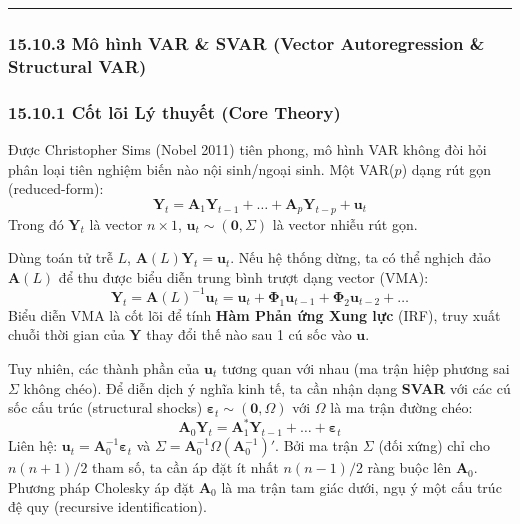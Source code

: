 \documentclass[
]{article}
\begin{document}
\begin{center}\rule{0.5\linewidth}{0.5pt}\end{center}

\subsubsection{15.10.3 Mô hình VAR \& SVAR (Vector Autoregression \&
Structural
VAR)}\label{muxf4-huxecnh-var-svar-vector-autoregression-structural-var}

\subsubsection{15.10.1 Cốt lõi Lý thuyết (Core
Theory)}\label{cux1ed1t-luxf5i-luxfd-thuyux1ebft-core-theory-57}

Được Christopher Sims (Nobel 2011) tiên phong, mô hình VAR không đòi hỏi
phân loại tiên nghiệm biến nào nội sinh/ngoại sinh. Một VAR(\(p\)) dạng
rút gọn (reduced-form):
\[ \mathbf{Y}_t = \mathbf{A}_1 \mathbf{Y}_{t-1} + \dots + \mathbf{A}_p \mathbf{Y}_{t-p} + \mathbf{u}_t \]
Trong đó \(\mathbf{Y}_t\) là vector \(n \times 1\),
\(\mathbf{u}_t \sim (\mathbf{0}, \Sigma)\) là vector nhiễu rút gọn.

Dùng toán tử trễ \(L\), \(\mathbf{A}(L)\mathbf{Y}_t = \mathbf{u}_t\).
Nếu hệ thống dừng, ta có thể nghịch đảo \(\mathbf{A}(L)\) để thu được
biểu diễn trung bình trượt dạng vector (VMA):
\[ \mathbf{Y}_t = \mathbf{A}(L)^{-1} \mathbf{u}_t = \mathbf{u}_t + \mathbf{\Phi}_1 \mathbf{u}_{t-1} + \mathbf{\Phi}_2 \mathbf{u}_{t-2} + \dots \]
Biểu diễn VMA là cốt lõi để tính \textbf{Hàm Phản ứng Xung lực} (IRF),
truy xuất chuỗi thời gian của \(\mathbf{Y}\) thay đổi thế nào sau 1 cú
sốc vào \(\mathbf{u}\).

Tuy nhiên, các thành phần của \(\mathbf{u}_t\) tương quan với nhau (ma
trận hiệp phương sai \(\Sigma\) không chéo). Để diễn dịch ý nghĩa kinh
tế, ta cần nhận dạng \textbf{SVAR} với các cú sốc cấu trúc (structural
shocks) \(\mathbf{\varepsilon}_t \sim (\mathbf{0}, \Omega)\) với
\(\Omega\) là ma trận đường chéo:
\[ \mathbf{A}_0 \mathbf{Y}_t = \mathbf{A}_1^* \mathbf{Y}_{t-1} + \dots + \mathbf{\varepsilon}_t \]
Liên hệ: \(\mathbf{u}_t = \mathbf{A}_0^{-1} \mathbf{\varepsilon}_t\) và
\(\Sigma = \mathbf{A}_0^{-1} \Omega (\mathbf{A}_0^{-1})'\). Bởi ma trận
\(\Sigma\) (đối xứng) chỉ cho \(n(n+1)/2\) tham số, ta cần áp đặt ít
nhất \(n(n-1)/2\) ràng buộc lên \(\mathbf{A}_0\). Phương pháp Cholesky
áp đặt \(\mathbf{A}_0\) là ma trận tam giác dưới, ngụ ý một cấu trúc đệ
quy (recursive identification).
\end{document}
